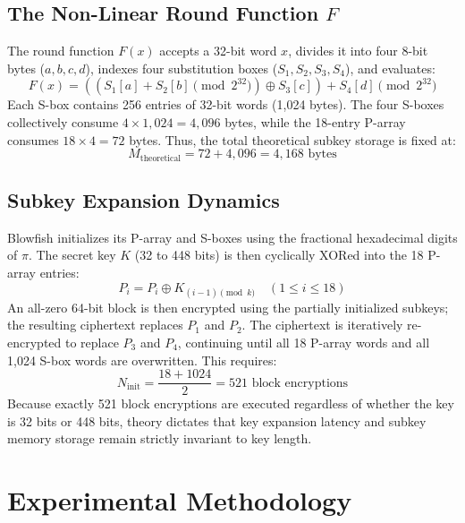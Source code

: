 \documentclass[conference]{IEEEtran}
\begin{document}
\subsection{The Non-Linear Round Function $F$}
The round function $F(x)$ accepts a 32-bit word $x$, divides it into four 8-bit bytes ($a, b, c, d$), indexes four substitution boxes ($S_1, S_2, S_3, S_4$), and evaluates:
\begin{equation}
F(x) = \left( \left( S_1[a] + S_2[b] \pmod{2^{32}} \right) \oplus S_3[c] \right) + S_4[d] \pmod{2^{32}}
\end{equation}
Each S-box contains 256 entries of 32-bit words (1,024 bytes). The four S-boxes collectively consume $4 \times 1,024 = 4,096$ bytes, while the 18-entry P-array consumes $18 \times 4 = 72$ bytes. Thus, the total theoretical subkey storage is fixed at:
\begin{equation}
M_{\text{theoretical}} = 72 + 4,096 = 4,168 \text{ bytes}
\end{equation}

\subsection{Subkey Expansion Dynamics}
Blowfish initializes its P-array and S-boxes using the fractional hexadecimal digits of $\pi$. The secret key $K$ (32 to 448 bits) is then cyclically XORed into the 18 P-array entries:
\begin{equation}
P_i = P_i \oplus K_{(i-1) \pmod{k}} \quad (1 \le i \le 18)
\end{equation}
An all-zero 64-bit block is then encrypted using the partially initialized subkeys; the resulting ciphertext replaces $P_1$ and $P_2$. The ciphertext is iteratively re-encrypted to replace $P_3$ and $P_4$, continuing until all 18 P-array words and all 1,024 S-box words are overwritten. This requires:
\begin{equation}
N_{\text{init}} = \frac{18 + 1024}{2} = 521 \text{ block encryptions}
\end{equation}
Because exactly 521 block encryptions are executed regardless of whether the key is 32 bits or 448 bits, theory dictates that key expansion latency and subkey memory storage remain strictly invariant to key length.

\section{Experimental Methodology}
\end{document}
